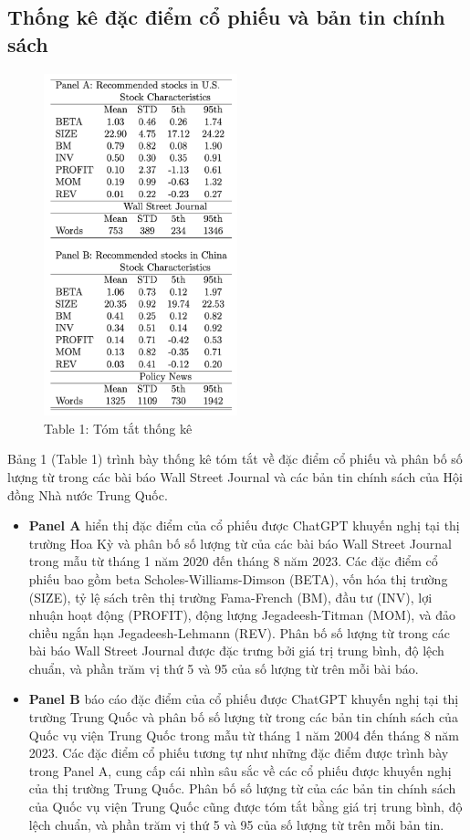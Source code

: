 \documentclass[a4paper,12pt]{article}
\begin{document}
\subsection{Thống kê đặc điểm cổ phiếu và bản tin chính sách}
\begin{figure}[H]
    \centering
    \includegraphics[width=0.5\textwidth]{table/tab1.png}
    \caption*{Table 1: Tóm tắt thống kê}
    \label{fig:tab1}
\end{figure}
Bảng 1 (Table 1) trình bày thống kê tóm tắt về đặc điểm cổ phiếu và phân bố số lượng từ trong các bài báo Wall Street Journal và các bản tin chính sách của Hội đồng Nhà nước Trung Quốc.
\begin{itemize}
\item \textbf{Panel A} hiển thị đặc điểm của cổ phiếu được ChatGPT khuyến nghị tại thị trường Hoa Kỳ và phân bố số lượng từ của các bài báo Wall Street Journal trong mẫu từ tháng 1 năm 2020 đến tháng 8 năm 2023. Các đặc điểm cổ phiếu bao gồm beta Scholes-Williams-Dimson (BETA), vốn hóa thị trường (SIZE), tỷ lệ sách trên thị trường Fama-French (BM), đầu tư (INV), lợi nhuận hoạt động (PROFIT), động lượng Jegadeesh-Titman (MOM), và đảo chiều ngắn hạn Jegadeesh-Lehmann (REV). Phân bố số lượng từ trong các bài báo Wall Street Journal được đặc trưng bởi giá trị trung bình, độ lệch chuẩn, và phần trăm vị thứ 5 và 95 của số lượng từ trên mỗi bài báo.
\item \textbf{Panel B} báo cáo đặc điểm của cổ phiếu được ChatGPT khuyến nghị tại thị trường Trung Quốc và phân bố số lượng từ trong các bản tin chính sách của Quốc vụ viện Trung Quốc trong mẫu từ tháng 1 năm 2004 đến tháng 8 năm 2023. Các đặc điểm cổ phiếu tương tự như những đặc điểm được trình bày trong Panel A, cung cấp cái nhìn sâu sắc về các cổ phiếu được khuyến nghị của thị trường Trung Quốc. Phân bố số lượng từ của các bản tin chính sách của Quốc vụ viện Trung Quốc cũng được tóm tắt bằng giá trị trung bình, độ lệch chuẩn, và phần trăm vị thứ 5 và 95 của số lượng từ trên mỗi bản tin.
\end{itemize}
\end{document}
